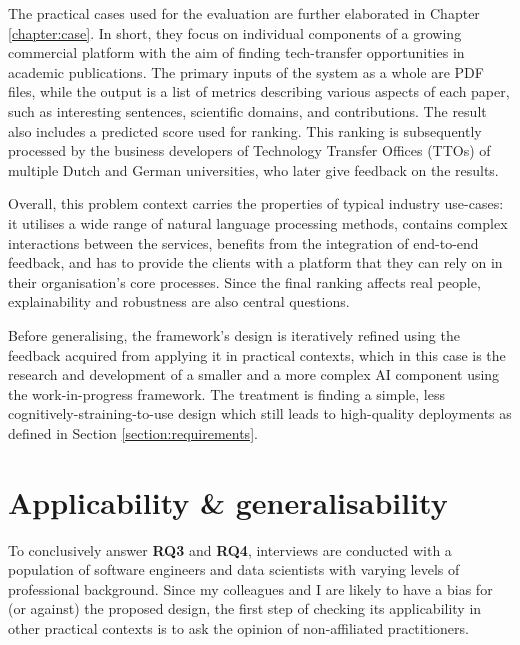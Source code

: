 The practical cases used for the evaluation are further elaborated in Chapter \ref{chapter:case}. In short, they focus on individual components of a growing commercial platform with the aim of finding tech-transfer opportunities in academic publications. The primary inputs of the system as a whole are PDF files, while the output is a list of metrics describing various aspects of each paper, such as interesting sentences, scientific domains, and contributions. The result also includes a predicted score used for ranking. This ranking is subsequently processed by the business developers of Technology Transfer Offices (TTOs) of multiple Dutch and German universities, who later give feedback on the results.

Overall, this problem context carries the properties of typical industry use-cases: it utilises a wide range of natural language processing methods, contains complex interactions between the services, benefits from the integration of end-to-end feedback, and has to provide the clients with a platform that they can rely on in their organisation's core processes. Since the final ranking affects real people, explainability and robustness are also central questions.

Before generalising, the framework's design is iteratively refined using the feedback acquired from applying it in practical contexts, which in this case is the research and development of a smaller and a more complex AI component using the work-in-progress framework. The treatment is finding a simple, less cognitively-straining-to-use design which still leads to high-quality deployments as defined in Section \ref{section:requirements}.

\section{Applicability \& generalisability} \label{section:interview-setup}

To conclusively answer \textbf{RQ3} and \textbf{RQ4}, interviews are conducted with a population of software engineers and data scientists with varying levels of professional background. Since my colleagues and I are likely to have a bias for (or against) the proposed design, the first step of checking its applicability in other practical contexts is to ask the opinion of non-affiliated practitioners.

